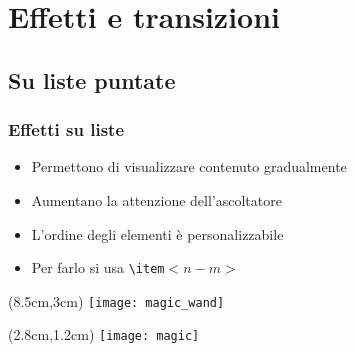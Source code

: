 \section{Effetti e transizioni}
\subsection{Su liste puntate}
\begin{frame}
  \frametitle{Effetti su liste}
  
  \begin{itemize}
   \item<1-3> Permettono di visualizzare contenuto gradualmente
   \item<2-> Aumentano la attenzione dell'ascoltatore
   \item<4-> L'ordine degli elementi è personalizzabile
   \item<3-> Per farlo si usa \texttt{\textbackslash item}$<n - m>$
  \end{itemize}
  
  
 \begin{textblock*}{5cm}(8.5cm,3cm)
    \texttt{[image: magic\_wand]}
  \end{textblock*}
  
  
 \begin{textblock*}{5cm}(2.8cm,1.2cm)
    \texttt{[image: magic]}
  \end{textblock*}

\end{frame}
 
